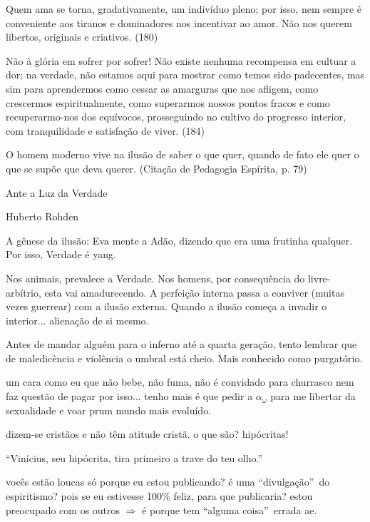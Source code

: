 \documentclass[12pt,a4paper]{article}
\begin{document}
			Quem ama se torna, gradativamente, um indiv\'iduo pleno; por isso, nem sempre \'e conveniente aos tiranos e dominadores nos incentivar ao amor. N\~ao nos querem libertos, originais e criativos. (180)

			N\~ao \`a gl\'oria em sofrer por sofrer! N\~ao existe nenhuma recompensa em cultuar a dor; na verdade, n\~ao estamos aqui para mostrar como temos sido padecentes, mas sim para aprendermos como cessar as amarguras que nos afligem, como crescermos espiritualmente, como superarmos nossos pontos fracos e como recuperarmo-nos dos equ\'ivocos, prosseguindo no cultivo do progresso interior, com tranquilidade e satisfa\c{c}\~ao de viver. (184)

			O homem moderno vive na ilus\~ao de saber o que quer, quando de fato ele quer o que se sup\~oe que deva querer. (Cita\c{c}\~ao de Pedagogia Esp\'irita\cite{x}, p. 79)

			Ante a Luz da Verdade

			Huberto Rohden %

			A g\^enese da ilus\~ao: Eva mente a Ad\~ao, dizendo que era uma frutinha qualquer. Por isso, Verdade \'e yang.

			Nos animais, prevalece a Verdade. Nos homens, por consequ\^encia do livre-arb\'itrio, esta vai amadurecendo. A perfei\c{c}\~ao interna passa a conviver (muitas vezes guerrear) com a ilus\~ao externa. Quando a ilus\~ao come\c{c}a a invadir o interior... aliena\c{c}\~ao de si mesmo.

			Antes de mandar algu\'em para o inferno\cite{x} at\'e a quarta gera\c{c}\~ao, tento lembrar que de maledic\^encia e viol\^encia o umbral est\'a cheio. Mais conhecido como purgat\'orio.

			um cara como eu que n\~ao bebe, n\~ao fuma, n\~ao \'e convidado para churrasco nem faz quest\~ao de pagar por isso... tenho mais \'e que pedir a $ \alpha_\omega $ para me libertar da sexualidade e voar prum mundo mais evolu\'ido.

			dizem-se crist\~aos e n\~ao t\^em atitude crist\~a. o que s\~ao? hip\'ocritas!

			\textquotedblleft Vin\'icius, seu hip\'ocrita, tira primeiro a trave do teu olho.\textquotedblright

			voc\^es est\~ao loucas s\'o porque eu estou publicando? \'e uma \textquotedblleft divulga\c{c}\~ao\textquotedblright\, do espiritismo? pois se eu estivesse 100\% feliz, para que publicaria? estou preocupado com os outros $ \Rightarrow $ \'e porque tem \textquotedblleft alguma coisa\textquotedblright\, errada ae.
\end{document}
